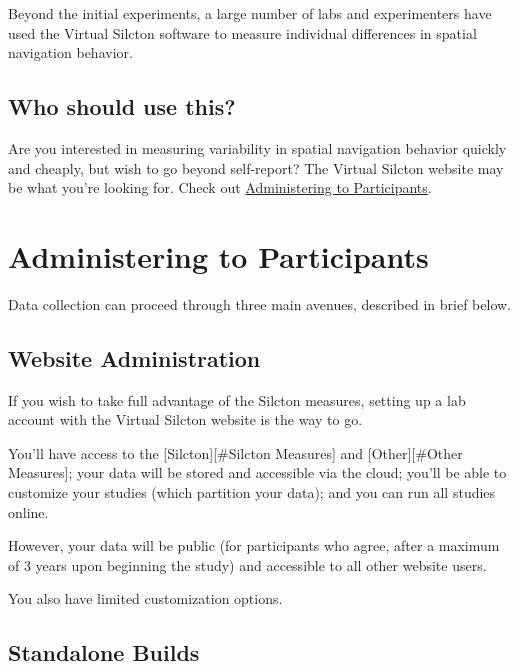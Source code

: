 \documentclass[
  12pt,
]{book}
\begin{document}
Beyond the initial experiments, a large number of labs and experimenters have used the Virtual Silcton software to measure individual differences in spatial navigation behavior.

\hypertarget{who-should-use-this}{%
\section{Who should use this?}\label{who-should-use-this}}

Are you interested in measuring variability in spatial navigation behavior quickly and cheaply, but wish to go beyond self-report? The Virtual Silcton website may be what you're looking for. Check out \protect\hyperlink{administering-to-participants}{Administering to Participants}.

\hypertarget{administering-to-participants}{%
\chapter{Administering to Participants}\label{administering-to-participants}}

Data collection can proceed through three main avenues, described in brief below.

\hypertarget{website-administration}{%
\section{Website Administration}\label{website-administration}}

If you wish to take full advantage of the Silcton measures, setting up a lab account with the Virtual Silcton website is the way to go.

You'll have access to the {[}Silcton{]}{[}\#Silcton Measures{]} and {[}Other{]}{[}\#Other Measures{]}; your data will be stored and accessible via the cloud; you'll be able to customize your studies (which partition your data); and you can run all studies online.

However, your data will be public (for participants who agree, after a maximum of 3 years upon beginning the study) and accessible to all other website users.

You also have limited customization options.

\hypertarget{standalone-builds}{%
\section{Standalone Builds}\label{standalone-builds}}
\end{document}
